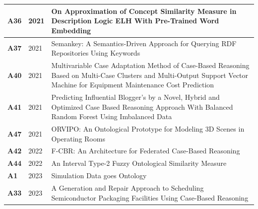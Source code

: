 {\begin{longtable}{ | m{1cm} | m{1.5cm} | m{12cm} | }
                    \hline
                    \textbf{A36} &2021 &On Approximation of Concept Similarity Measure in Description Logic ELH With Pre-Trained Word Embedding \\ %
                    \hline
                    \textbf{A37} &2021 &Semankey: A Semantics-Driven Approach for Querying RDF Repositories Using Keywords \\ %
                    \hline
                    \textbf{A40} &2021 &Multivariable Case Adaptation Method of Case-Based Reasoning Based on Multi-Case Clusters and Multi-Output Support Vector Machine for Equipment Maintenance Cost Prediction \\ %
                    \hline
                    \textbf{A41} &2021 &Predicting Influential Blogger’s by a Novel, Hybrid and Optimized Case Based Reasoning Approach With Balanced Random Forest Using Imbalanced Data \\ %
                    \hline
                    \textbf{A47} &2021 &ORVIPO: An Ontological Prototype for Modeling 3D Scenes in Operating Rooms \\ %
                    \hline
                    \textbf{A42} &2022 &F-CBR: An Architecture for Federated Case-Based Reasoning \\ %
                    \hline
                    \textbf{A44} &2022 &An Interval Type-2 Fuzzy Ontological Similarity Measure \\ %
                    \hline
                    \textbf{A1} &2023 &Simulation Data goes Ontology \\ %
                    \hline
                    \textbf{A33} &2023 &A Generation and Repair Approach to Scheduling Semiconductor Packaging Facilities Using Case-Based Reasoning \\ %
                    \hline
                \end{longtable}}%
            
